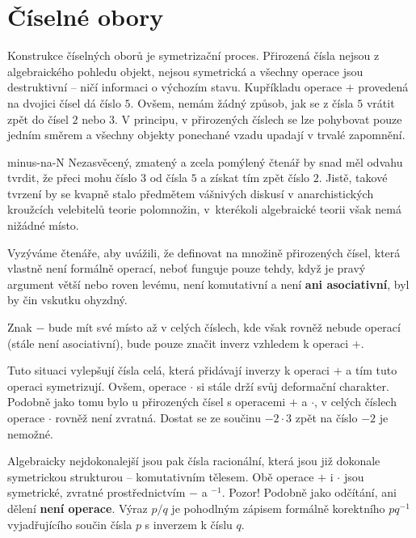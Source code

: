 \section{Číselné obory}
\label{sec:ciselne-obory}

Konstrukce číselných oborů je symetrizační proces. Přirozená čísla nejsou z
algebraického pohledu  objekt, nejsou symetrická a všechny operace
jsou destruktivní -- ničí informaci o výchozím stavu. Kupříkladu operace $+$
provedená na dvojici čísel dá číslo $5$. Ovšem, nemám žádný způsob, jak se z
čísla $5$ vrátit zpět do čísel $2$ nebo $3$. V principu, v přirozených číslech
se lze pohybovat pouze jedním směrem a všechny objekty ponechané vzadu upadají v
trvalé zapomnění.

\begin{warning}{}{minus-na-N}
 Nezasvěcený, zmatený a zcela pomýlený čtenář by snad měl odvahu tvrdit, že
 přeci mohu číslo $3$ od čísla $5$ \textbf{} a získat tím zpět
 číslo $2$. Jistě, takové tvrzení by se kvapně stalo předmětem vášnivých diskusí
 v anarchistických kroužcích velebitelů teorie polomnožin, v~kterékoli
 algebraické teorii však nemá nižádné místo.

 Vyzýváme čtenáře, aby uvážili, že definovat  na množině
 přirozených čísel, která vlastně není formálně operací, neboť funguje pouze
 tehdy, když je pravý argument větší nebo roven levému, není komutativní a není
 \textbf{ani asociativní}, byl by čin vskutku ohyzdný.

 Znak $-$ bude mít své místo až v celých číslech, kde však rovněž nebude operací
 (stále není asociativní), bude pouze značit inverz vzhledem k operaci $+$.
\end{warning}

Tuto situaci vylepšují čísla celá, která přidávají inverzy k operaci $+$ a
tím tuto operaci symetrizují. Ovšem, operace $ \cdot $ si stále drží svůj
deformační charakter. Podobně jako tomu bylo u přirozených čísel s operacemi $+$
a $ \cdot $, v celých číslech operace $ \cdot $ rovněž není zvratná. Dostat se
ze součinu $-2 \cdot 3$ zpět na číslo $-2$ je nemožné.

Algebraicky nejdokonalejší jsou pak čísla racionální, která jsou již dokonale
symetrickou strukturou -- komutativním tělesem. Obě operace $+$ i $ \cdot $ jsou
symetrické, zvratné prostřednictvím $-$ a $^{-1}$. Pozor! Podobně jako odčítání,
ani dělení \textbf{není operace}. Výraz $p / q$ je pohodlným zápisem formálně
korektního $pq^{-1}$ vyjadřujícího součin čísla $p$ s inverzem k číslu $q$.

